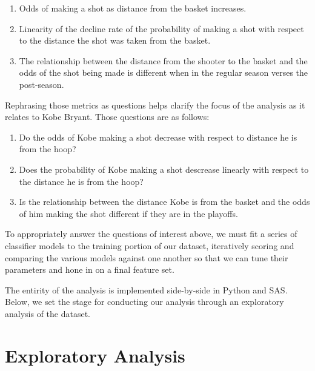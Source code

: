 \begin{enumerate}
    \item Odds of making a shot as distance from the basket increases.

    \item Linearity of the decline rate of the probability of making a shot with respect to the distance the shot was taken from the basket.

    \item The relationship between the distance from the shooter to the basket and the odds of the shot being made is different when in the regular season verses the post-season.
\end{enumerate}

Rephrasing those metrics as questions helps clarify the focus of the analysis as it relates to Kobe Bryant. Those questions are as follows:

\begin{enumerate}
    \item Do the odds of Kobe making a shot decrease with respect to distance he is from the hoop?

    \item Does the probability of Kobe making a shot descrease linearly with respect to the distance he is from the hoop?

    \item Is the relationship between the distance Kobe is from the basket and the odds of him making the shot different if they are in the playoffs.
\end{enumerate}

\par
\indent To appropriately answer the questions of interest above, we must fit a series of classifier models to the training portion of our dataset, iteratively scoring and comparing the various models against one another so that we can tune their parameters and hone in on a final feature set.\par
The entirity of the analysis is implemented side-by-side in Python and SAS.
Below, we set the stage for conducting our analysis through an exploratory analysis of the dataset.\par


\section{Exploratory Analysis}

